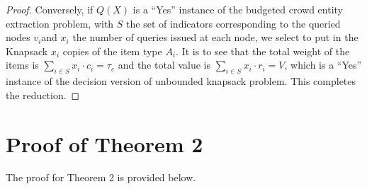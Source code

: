 \documentclass[conference]{IEEEtran}
\begin{document}
\begin{proof}
Conversely, if $Q(X)$ is a ``Yes'' instance of the budgeted crowd entity extraction problem, with $S$ the set of indicators corresponding to the queried nodes $v_i$and $x_i$ the number of queries issued at each node, we select to put in the Knapsack $x_i$ copies of the item type $A_i$. It is to see that the total weight of the items is $\sum_{i \in S} x_i \cdot c_i = \tau_c$ and the total value is $\sum_{i \in S} x_i \cdot r_i = V$, which is a ``Yes'' instance of the decision version of unbounded knapsack problem. This completes the reduction. 
\end{proof}

\section{Proof of Theorem 2}
\label{sec:prth2}
The proof for Theorem 2 is provided below.
\end{document}
